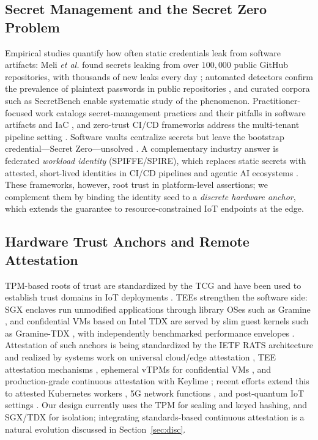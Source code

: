 \documentclass[journal]{IEEEtran}
\begin{document}
\subsection{Secret Management and the Secret Zero Problem}
Empirical studies quantify how often static credentials leak from software
artifacts: Meli \emph{et al.} found secrets leaking from over $100{,}000$
public GitHub repositories, with thousands of new leaks every day
\cite{meli2019git}; automated detectors confirm the prevalence of plaintext
passwords in public repositories \cite{feng2022password}, and curated corpora
such as SecretBench \cite{basak2023secretbench} enable systematic study of the
phenomenon. Practitioner-focused work catalogs secret-management practices and
their pitfalls in software artifacts and IaC
\cite{basak2022,rahman2021,patel2025}, and zero-trust CI/CD frameworks address
the multi-tenant pipeline setting \cite{anuganti2025}. Software vaults
\cite{hashivault2024} centralize secrets but leave the bootstrap
credential---Secret Zero---unsolved \cite{oliveira2024}. A complementary
industry answer is federated \emph{workload identity} (SPIFFE/SPIRE), which
replaces static secrets with attested, short-lived identities in CI/CD
pipelines \cite{avirneni2025spiffe} and agentic AI ecosystems
\cite{pappu2025spiffeai}. These frameworks, however, root trust in
platform-level assertions; we complement them by binding the identity seed to
a \emph{discrete hardware anchor}, which extends the guarantee to
resource-constrained IoT endpoints at the edge.

\subsection{Hardware Trust Anchors and Remote Attestation}
TPM-based roots of trust are standardized by the TCG \cite{tcg2019} and have
been used to establish trust domains in IoT deployments
\cite{faisal2020tpmiot,furtak2019securedomain}. TEEs strengthen the software
side: SGX enclaves \cite{costan2016} run unmodified applications through
library OSes such as Gramine \cite{tsai2017graphene}, and confidential VMs
based on Intel TDX \cite{cheng2023} are served by slim guest kernels such as
Gramine-TDX \cite{kuvaiskii2024gramine}, with independently benchmarked
performance envelopes \cite{coppolino2025}. Attestation of such anchors is
being standardized by the IETF RATS architecture \cite{rfc9334} and realized
by systems work on universal cloud/edge attestation \cite{ott2023universal},
TEE attestation mechanisms \cite{menetrey2022attestation}, ephemeral vTPMs
for confidential VMs \cite{narayanan2023vtpm}, and production-grade continuous
attestation with Keylime \cite{ruffin2025keylime}; recent efforts extend this
to attested Kubernetes workers \cite{thijsman2024attestedk8s}, 5G network
functions \cite{emran2025vnf}, and post-quantum IoT settings
\cite{eckel2025pqattest}. Our design currently uses the TPM for sealing and
keyed hashing, and SGX/TDX for isolation; integrating standards-based
continuous attestation is a natural evolution discussed in
Section~\ref{sec:disc}.
\end{document}
